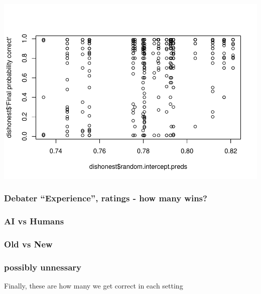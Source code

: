 \documentclass[
]{article}
\newenvironment{Shaded}{\begin{snugshade}}{\end{snugshade}}
\newcommand{\FunctionTok}[1]{\textcolor[rgb]{0.00,0.00,0.00}{#1}}
\newcommand{\NormalTok}[1]{#1}
\newcommand{\OtherTok}[1]{\textcolor[rgb]{0.56,0.35,0.01}{#1}}
\newcommand{\SpecialCharTok}[1]{\textcolor[rgb]{0.00,0.00,0.00}{#1}}
\begin{document}
\includegraphics{debate-2309_files/figure-latex/unnamed-chunk-3-9.pdf}

\hypertarget{debater-experience-ratings---how-many-wins}{%
\subsubsection{Debater ``Experience'', ratings - how many
wins?}\label{debater-experience-ratings---how-many-wins}}

\hypertarget{ai-vs-humans}{%
\subsubsection{AI vs Humans}\label{ai-vs-humans}}

\hypertarget{old-vs-new}{%
\subsubsection{Old vs New}\label{old-vs-new}}

\hypertarget{possibly-unnessary}{%
\subsubsection{possibly unnessary}\label{possibly-unnessary}}

Finally, these are how many we get correct in each setting

\begin{Shaded}
\end{Shaded}
\end{document}
